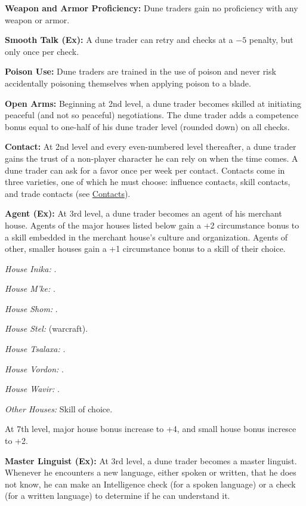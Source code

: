 {
\textbf{Weapon and Armor Proficiency:} Dune traders gain no proficiency with any weapon or armor.

\textbf{Smooth Talk (Ex):} A dune trader can retry  and  checks at a $-5$ penalty, but only once per check.

\textbf{Poison Use:} Dune traders are trained in the use of poison and never risk accidentally poisoning themselves when applying poison to a blade.

\textbf{Open Arms:} Beginning at 2nd level, a dune trader becomes skilled at initiating peaceful (and not so peaceful) negotiations. The dune trader adds a competence bonus equal to one-half of his dune trader level (rounded down) on all  checks.

\textbf{Contact:} At 2nd level and every even-numbered level thereafter, a dune trader gains the trust of a non-player character he can rely on when the time comes. A dune trader can ask for a favor once per week per contact. Contacts come in three varieties, one of which he must choose: influence contacts, skill contacts, and trade contacts (see \hyperref[sec:contacts]{Contacts}).

\textbf{Agent (Ex):} At 3rd level, a dune trader becomes an agent of his merchant house. Agents of the major houses listed below gain a +2 circumstance bonus to a skill embedded in the merchant house's culture and organization. Agents of other, smaller houses gain a +1 circumstance bonus to a skill of their choice.

\textit{House Inika:} .

\textit{House M'ke:} .

\textit{House Shom:} .

\textit{House Stel:}  (warcraft).

\textit{House Tsalaxa:} .

\textit{House Vordon:} .

\textit{House Wavir:} .

\textit{Other Houses:} Skill of choice.

At 7th level, major house bonus increase to +4, and small house bonus incresce to +2.

\textbf{Master Linguist (Ex):} At 3rd level, a dune trader becomes a master linguist. Whenever he encounters a new language, either spoken or written, that he does not know, he can make an Intelligence check (for a spoken language) or a  check (for a written language) to determine if he can understand it.

}

